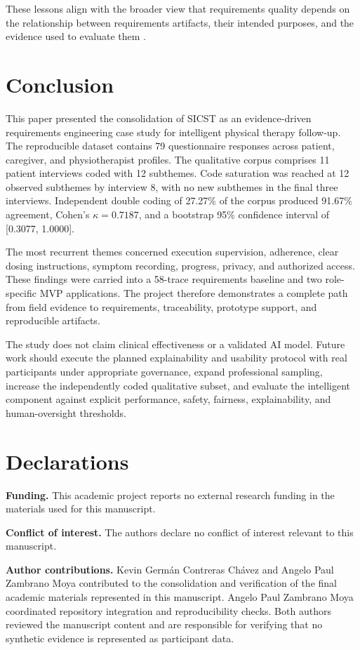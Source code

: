 \documentclass[pdflatex,sn-basic]{sn-jnl}
\begin{document}
These lessons align with the broader view that requirements quality depends on the relationship between requirements artifacts, their intended purposes, and the evidence used to evaluate them \citep{grosser2024templates,knauss2018clarification}.

\section{Conclusion}
This paper presented the consolidation of SICST as an evidence-driven requirements engineering case study for intelligent physical therapy follow-up. The reproducible dataset contains 79 questionnaire responses across patient, caregiver, and physiotherapist profiles. The qualitative corpus comprises 11 patient interviews coded with 12 subthemes. Code saturation was reached at 12 observed subthemes by interview 8, with no new subthemes in the final three interviews. Independent double coding of 27.27\% of the corpus produced 91.67\% agreement, Cohen's $\kappa=0.7187$, and a bootstrap 95\% confidence interval of [0.3077, 1.0000].

The most recurrent themes concerned execution supervision, adherence, clear dosing instructions, symptom recording, progress, privacy, and authorized access. These findings were carried into a 58-trace requirements baseline and two role-specific MVP applications. The project therefore demonstrates a complete path from field evidence to requirements, traceability, prototype support, and reproducible artifacts.

The study does not claim clinical effectiveness or a validated AI model. Future work should execute the planned explainability and usability protocol with real participants under appropriate governance, expand professional sampling, increase the independently coded qualitative subset, and evaluate the intelligent component against explicit performance, safety, fairness, explainability, and human-oversight thresholds.

\section*{Declarations}
\textbf{Funding.} This academic project reports no external research funding in the materials used for this manuscript.

\textbf{Conflict of interest.} The authors declare no conflict of interest relevant to this manuscript.

\textbf{Author contributions.} Kevin Germán Contreras Chávez and Angelo Paul Zambrano Moya contributed to the consolidation and verification of the final academic materials represented in this manuscript. Angelo Paul Zambrano Moya coordinated repository integration and reproducibility checks. Both authors reviewed the manuscript content and are responsible for verifying that no synthetic evidence is represented as participant data.
\end{document}
